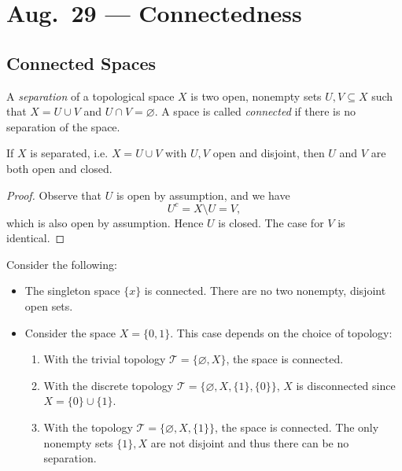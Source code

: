 \chapter{Aug.~29 --- Connectedness}

\section{Connected Spaces}
\begin{definition}
  A \emph{separation} of a topological space $X$
  is two open, nonempty sets $U, V \subseteq X$ such
  that $X = U \cup V$ and $U \cap V = \varnothing$.
  A space is called \emph{connected}
  if there is no separation of the space.
\end{definition}

\begin{prop}
  If $X$ is separated, i.e.
  $X = U \cup V$ with $U, V$ open and disjoint,
  then $U$ and $V$ are both open and closed.
\end{prop}

\begin{proof}
  Observe that $U$ is open by assumption, and we have
  \[
    U^c = X \setminus U = V,
  \]
  which is also open by assumption. Hence
  $U$ is closed. The case for $V$ is identical.
\end{proof}

\begin{example}
  Consider the following:
  \begin{itemize}
    \item The singleton space $\{x\}$ is connected. There
      are no two nonempty, disjoint open sets.
    \item Consider the space $X = \{0, 1\}$. This
      case depends on the choice of topology:
      \begin{enumerate}
        \item With the trivial topology
          $\mathcal{T} = \{\varnothing, X\}$, the
          space is connected.
        \item With the discrete topology
          $\mathcal{T} = \{\varnothing, X, \{1\}, \{0\}\}$,
          $X$ is disconnected since
          $X = \{0\} \cup \{1\}$.
        \item With the topology
          $\mathcal{T} = \{\varnothing, X, \{1\}\}$,
          the space is connected. The only
          nonempty sets $\{1\}, X$ are not disjoint
          and thus there can be no separation.
      \end{enumerate}
  \end{itemize}
\end{example}

